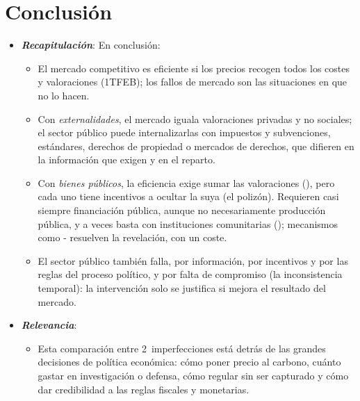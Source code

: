 \documentclass[11pt]{article}
\begin{document}
\section*{Conclusión}

\begin{itemize}
\item \textbf{\emph{Recapitulación}}: En conclusión:
  \begin{itemize}
  \item El mercado competitivo es eficiente si los precios recogen todos los costes y valoraciones (1TFEB); los fallos de mercado son las situaciones en que no lo hacen.
  \item Con \emph{externalidades}, el mercado iguala valoraciones privadas y no sociales; el sector público puede internalizarlas con impuestos y subvenciones, estándares, derechos de propiedad o mercados de derechos, que difieren en la información que exigen y en el reparto.
  \item Con \emph{bienes públicos}, la eficiencia exige sumar las valoraciones (), pero cada uno tiene incentivos a ocultar la suya (el polizón). Requieren casi siempre financiación pública, aunque no necesariamente producción pública, y a veces basta con instituciones comunitarias (); mecanismos como - resuelven la revelación, con un coste.
  \item El sector público también falla, por información, por incentivos y por las reglas del proceso político, y por falta de compromiso (la inconsistencia temporal): la intervención solo se justifica si mejora el resultado del mercado.
  \end{itemize}

\item \textbf{\emph{Relevancia}}:
  \begin{itemize}
  \item Esta comparación entre 2~imperfecciones está detrás de las grandes decisiones de política económica: cómo poner precio al carbono, cuánto gastar en investigación o defensa, cómo regular sin ser capturado y cómo dar credibilidad a las reglas fiscales y monetarias.
  \end{itemize}


\end{itemize}
\end{document}
